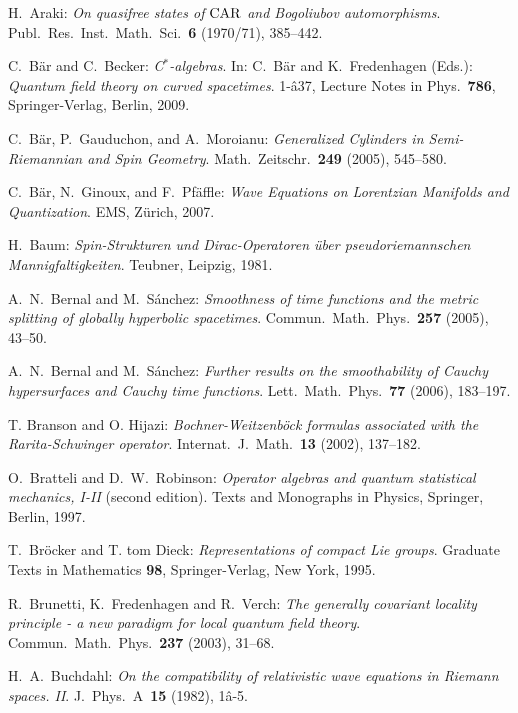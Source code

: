 \documentclass[a4paper,11pt]{amsart}
\theoremstyle{definition}
\begin{document}
\begin{thebibliography}{11}

{\sc H.~Araki:}
{\em On quasifree states of ${\rm CAR}$ and Bogoliubov automorphisms}.
Publ.\ Res.\ Inst.\ Math.\ Sci.~{\bf 6} (1970/71), 385--442.

{\sc C.~B\"ar and C.~Becker:}
{\em {\mbox{C$^*$}}-algebras}. 
In: C.~B\"ar and K.~Fredenhagen (Eds.): 
{\em Quantum field theory on curved spacetimes}. 1-â37,
Lecture Notes in Phys.~\textbf{786}, Springer-Verlag, Berlin, 2009.

{\sc C.~B\"ar, P.~Gauduchon, and A.~Moroianu:}
{\em Generalized Cylinders in Semi-Riemannian and Spin Geometry}.
Math.~Zeitschr.~{\bf 249} (2005), 545--580.

{\sc C.~B\"ar, N.~Ginoux, and F.~Pf\"affle:}
{\em Wave Equations on Lorentzian Manifolds and Quantization}.
EMS, Z\"urich, 2007.

{\sc H.~Baum:}
{\em Spin-Strukturen und Dirac-Operatoren \"uber pseudoriemannschen
  Mannigfaltigkeiten}.
Teubner, Leipzig, 1981.

{\sc A.~N.~Bernal and M.~S\'anchez:}
{\em Smoothness of time functions and the metric splitting of globally hyperbolic spacetimes}.
Commun.\ Math.\ Phys.~\textbf{257} (2005), 43--50.

{\sc A.~N.~Bernal and M.~S\'anchez:}
{\em Further results on the smoothability of Cauchy hypersurfaces and Cauchy time functions}.
Lett.\ Math.\ Phys.~\textbf{77} (2006), 183--197.

{\sc T. Branson and O. Hijazi:} 
{\em Bochner-Weitzenb\"ock formulas associated with the Rarita-Schwinger operator}.
Internat.\ J.\ Math.~\textbf{13} (2002), 137--182.

{\sc O.~Bratteli and D.~W.~Robinson:}
{\em Operator algebras and quantum statistical mechanics, I-II} (second edition).
Texts and Monographs in Physics, Springer, Berlin, 1997.

{\sc T.~Br\"ocker and T. tom Dieck:}
{\em Representations of compact Lie groups}.
Graduate Texts in Mathematics \textbf{98}, Springer-Verlag, New York, 1995. 

{\sc R.~Brunetti, K.~Fredenhagen and R.~Verch:}
{\em The generally covariant locality principle - a new paradigm for local quantum field theory}.
Commun.\ Math.\ Phys.~\textbf{237} (2003), 31--68.

{\sc H.~A.~Buchdahl:}
{\em On the compatibility of relativistic wave equations in Riemann spaces. II}.
J.\ Phys.~A~\textbf{15} (1982), 1â-5.


\end{thebibliography}
\end{document}
